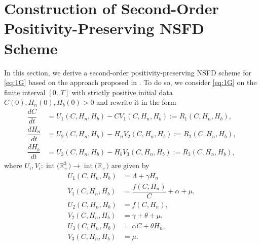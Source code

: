 \documentclass[11pt]{article}
\theoremstyle{definition}
\theoremstyle{remark}
\numberwithin{equation}{section}
\DeclareMathOperator{\interior}{int}
\begin{document}
\section{Construction of Second-Order Positivity-Preserving NSFD Scheme}\label{Sec3}
In this section, we derive  a second-order positivity-preserving NSFD scheme for \eqref{eq:1G} based on the approach proposed in \cite{HoangMatthias2026}. 
To do so, we consider \eqref{eq:1G} on the finite interval $[0,\,T]$ with  strictly positive initial data $C(0), H_n(0), H_b(0) > 0$ and rewrite it in the form
\begin{equation}\label{eq:1Gnew}
\begin{split}
  \dfrac{dC}{dt} &= U_1(C, H_n, H_b) - CV_1(C, H_n, H_b) := R_1(C, H_n, H_b),\\
  \dfrac{dH_n}{dt} &= U_2(C, H_n, H_b) - H_nV_2(C, H_n, H_b) := R_2(C, H_n, H_b),\\
  \dfrac{dH_b}{dt} &= U_3(C, H_n, H_b) - H_bV_3(C, H_n, H_b) := R_3(C, H_n, H_b),
\end{split}
\end{equation}
where $U_i, V_i\colon\interior\big(\mathbb{R}_+^3\big) \to \interior\big(\mathbb{R}_+\big)$ are given by
\begin{equation}\label{eq:2Gnew}
\begin{split}
U_1(C, H_n, H_b) &=  \Lambda + \gamma H_n\\
V_1(C, H_n, H_b) &= \dfrac{f(C, H_n)}{C} + \alpha + \mu,\\
U_2(C, H_n, H_b) &= f(C, H_n),\\
 V_2(C, H_n, H_b) &= \gamma + \theta  + \mu,\\
U_3(C, H_n, H_b) &=  \alpha C + \theta H_n,\\
V_3(C, H_n, H_b) &= \mu.
\end{split}
\end{equation}
\end{document}
